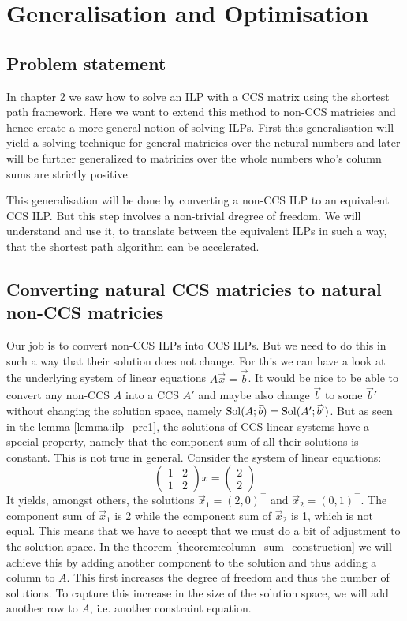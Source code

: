 \chapter{Generalisation and Optimisation}
\section{Problem statement}
In chapter 2 we saw how to solve an ILP with a CCS matrix using the shortest path framework. Here we want to extend this method to non-CCS matricies and hence create a more general notion of solving ILPs. First this generalisation will yield a solving technique for general matricies over the netural numbers and later will be further generalized to matricies over the whole numbers who's column sums are strictly positive. 

This generalisation will be done by converting a non-CCS ILP to an equivalent CCS ILP. But this step involves a non-trivial dregree of freedom. We will understand and use it, to translate between the equivalent ILPs in such a way, that the shortest path algorithm can be accelerated. 

\section{Converting natural CCS matricies to natural non-CCS matricies}
Our job is to convert non-CCS ILPs into CCS ILPs. But we need to do this in such a way that their solution does not change. For this we can have a look at the underlying system of linear equations $A\vec x = \vec b$. It would be nice to be able to convert any non-CCS $A$ into a CCS $A'$ and maybe also change $\vec b$ to some $\vec b'$ without changing the solution space, namely $\operatorname{Sol}(A;\vec b) = \operatorname{Sol}(A';\vec b')$. But as seen in the lemma \ref{lemma:ilp_pre1}, the solutions of CCS linear systems have a special property, namely that the component sum of all their solutions is constant. This is not true in general. Consider the system of linear equations:
$$
\left(\begin{matrix}
    1 & 2\\
    1 & 2
\end{matrix}\right)
x = \left(\begin{matrix}
    2\\2
\end{matrix}\right)
$$
It yields, amongst others, the solutions $\vec x_1 = (2, 0)^\top$ and $\vec x_2 = (0, 1)^\top$. The component sum of $\vec x_1$ is 2 while the component sum of $\vec x_2$ is 1, which is not equal. This means that we have to accept that we must do a bit of adjustment to the solution space. In the theorem \ref{theorem:column_sum_construction} we will achieve this by adding another component to the solution and thus adding a column to $A$. This first increases the degree of freedom and thus the number of solutions. To capture this increase in the size of the solution space, we will add another row to $A$, i.e. another constraint equation.

